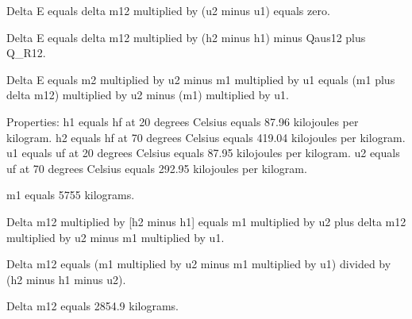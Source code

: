 Delta E equals delta m12 multiplied by (u2 minus u1) equals zero.  

Delta E equals delta m12 multiplied by (h2 minus h1) minus Qaus12 plus Q_R12.  

Delta E equals m2 multiplied by u2 minus m1 multiplied by u1 equals (m1 plus delta m12) multiplied by u2 minus (m1) multiplied by u1.  

Properties:  
h1 equals hf at 20 degrees Celsius equals 87.96 kilojoules per kilogram.  
h2 equals hf at 70 degrees Celsius equals 419.04 kilojoules per kilogram.  
u1 equals uf at 20 degrees Celsius equals 87.95 kilojoules per kilogram.  
u2 equals uf at 70 degrees Celsius equals 292.95 kilojoules per kilogram.  

m1 equals 5755 kilograms.  

Delta m12 multiplied by [h2 minus h1] equals m1 multiplied by u2 plus delta m12 multiplied by u2 minus m1 multiplied by u1.  

Delta m12 equals (m1 multiplied by u2 minus m1 multiplied by u1) divided by (h2 minus h1 minus u2).  

Delta m12 equals 2854.9 kilograms.